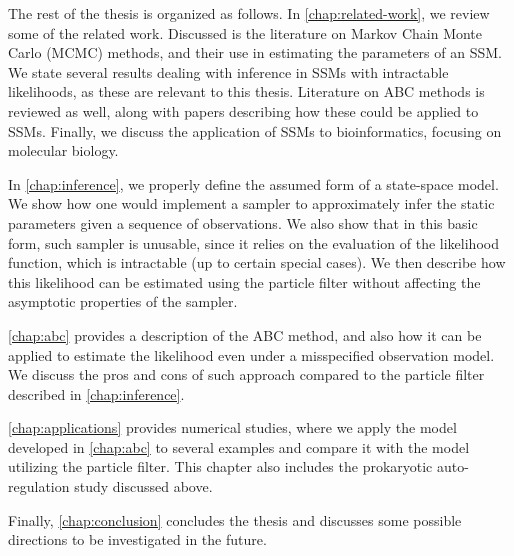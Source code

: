 The rest of the thesis is organized as follows. In \autoref{chap:related-work}, we review some of the related work. Discussed is the literature on Markov Chain Monte Carlo (MCMC) methods, and their use in estimating the parameters of an SSM. We state several results dealing with inference in SSMs with intractable likelihoods, as these are relevant to this thesis. Literature on ABC methods is reviewed as well, along with papers describing how these could be applied to SSMs. Finally, we discuss the application of SSMs to bioinformatics, focusing on molecular biology.

In \autoref{chap:inference}, we properly define the assumed form of a state-space model. We show how one would implement a sampler to approximately infer the static parameters given a sequence of observations. We also show that in this basic form, such sampler is unusable, since it relies on the evaluation of the likelihood function, which is intractable (up to certain special cases). We then describe how this likelihood can be estimated using the particle filter \citep{particle-filter} without affecting the asymptotic properties of the sampler.

\autoref{chap:abc} provides a description of the ABC method, and also how it can be applied to estimate the likelihood even under a misspecified observation model. We discuss the pros and cons of such approach compared to the particle filter described in \autoref{chap:inference}.

\autoref{chap:applications} provides numerical studies, where we apply the model developed in \autoref{chap:abc} to several examples and compare it with the model utilizing the particle filter. This chapter also includes the prokaryotic auto-regulation study discussed above.

Finally, \autoref{chap:conclusion} concludes the thesis and discusses some possible directions to be investigated in the future.
